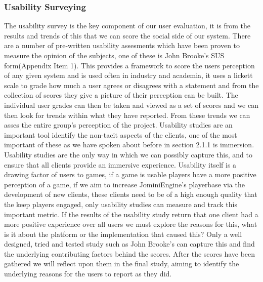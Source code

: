 \documentclass{article}
\begin{document}
	\subsubsection{Usability Surveying}
	The usability survey is the key component of our user evaluation, it is from the results and trends of this that we can score the social side of our system. There are a number of pre-written usability assesments which have been proven to measure the opinion of the subjects, one of these is John Brooke's SUS form\cite{Brooke96sus:a}(Appendix Item 1). This provides a framework to score the users perception of any given system and is used often in industry and academia, it uses a lickett scale to grade how much a user agrees or disagrees with a statement and from the collection of scores they give a picture of their perception can be built. The individual user grades can then be taken and viewed as a set of scores and we can then look for trends within what they have reported. From these trends we can asses the entire group's perception of the project. Usability studies are an important tool identify the non-tacit aspects of the clients, one of the most important of these as we have spoken about before in section 2.1.1 is immersion. Usability studies are the only way in which we can possibly capture this, and to ensure that all clients provide an immersive experience. Usability itself is a drawing factor of users to games, if a game is usable players have a more positive perception of a game\cite{Christou:2012:EPP:2367616.2367630}, if we aim to increase JominiEngine's playerbase via the development of new clients, these clients need to be of a high enough quality that the keep players engaged, only usability studies can measure and track this important metric. If the results of the usability study return that one client had a more positive experience over all users we must explore the reasons for this, what is it about the platform or the implementation that caused this? Only a well designed, tried and tested study such as John Brooke's can capture this and find the underlying contributing factors behind the scores. After the scores have been gathered we will reflect upon them in the final study, aiming to identify the underlying reasons for the users to report as they did.
\end{document}

